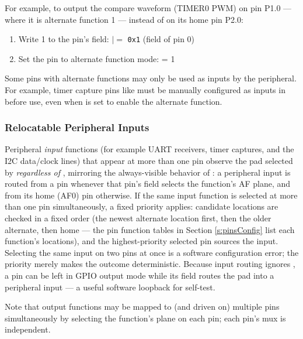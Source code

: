 For example, to output the  compare waveform (TIMER0 PWM) on pin P1.0 --- where it is alternate function 1 --- instead of on its home pin P2.0:

\begin{enumerate}
\item Write 1 to the pin's  field:  $\mathrel{|}=$ \texttt{0x1} (field of pin 0)
\item Set the pin to alternate function mode:  = 1
\end{enumerate}

Some pins with alternate functions may only be used as inputs by the peripheral. For example, timer capture pins like  must be manually configured as inputs in  before use, even when  is set to enable the alternate function.

\subsubsection{Relocatable Peripheral Inputs}

Peripheral \emph{input} functions (for example UART receivers, timer captures, and the I2C data/clock lines) that appear at more than one pin observe the pad selected by  \emph{regardless of} , mirroring the always-visible behavior of : a peripheral input is routed from a pin whenever that pin's  field selects the function's AF plane, and from its home (AF0) pin otherwise. If the same input function is selected at more than one pin simultaneously, a fixed priority applies: candidate locations are checked in a fixed order (the newest alternate location first, then the older alternate, then home --- the pin function tables in Section \ref{s:pinsConfig} list each function's locations), and the highest-priority selected pin sources the input. Selecting the same input on two pins at once is a software configuration error; the priority merely makes the outcome deterministic. Because input routing ignores , a pin can be left in GPIO output mode while its  field routes the pad into a peripheral input --- a useful software loopback for self-test.

Note that output functions may be mapped to (and driven on) multiple pins simultaneously by selecting the function's plane on each pin; each pin's mux is independent.



